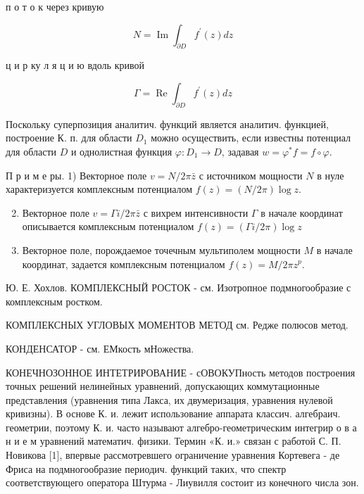 \documentclass[10pt]{article}
\begin{document}
п о т о к через кривую



\[

N=\operatorname{Im} \int_{\partial D} f^{\prime}(z) d z

\]



ц и р ку л я ц и ю вдоль кривой



\[

\Gamma=\operatorname{Re} \int_{\partial D} f^{\prime}(z) d z

\]



Поскольку суперпозиция аналитич. функций является аналитич. функцией, построение К. п. для области $D_{1}$ можно осуществить, если известны потенциал для области $D$ и однолистная функция $\varphi: D_{1} \rightarrow D$, задавая $w=\varphi^{*} f=f \circ \varphi$.



П р и м е ры. 1) Векторное поле $v=N / 2 \pi \bar{z}$ с источником мощности $N$ в нуле характеризуется комплексным потенциалом $f(z)=(N / 2 \pi) \log z$.



\begin{enumerate}

  \setcounter{enumi}{1}

  \item Векторное поле $v=\Gamma i / 2 \pi \bar{z}$ с вихрем интенсивности $\Gamma$ в начале координат описывается комплексным потенциалом $f(z)=(\Gamma i / 2 \pi) \log z$



  \item Векторное поле, порождаемое точечным мультиполем мощности $M$ в начале координат, задается комплексным потенциалом $f(z)=M / 2 \pi z^{p}$.



\end{enumerate}



Ю. Е. Хохлов. КОМПЛЕКСНЫЙ РОСТОК - см. Изотропное подмногообразие с комплексным ростком.



КОМПЛЕКСНЫХ УГЛОВЫХ МОМЕНТОВ МЕТОД см. Редже полюсов метод.



КОНДЕНСАТОР - см. ЕМкость мНожества.



КОНЕЧНОЗОННОЕ ИНТЕТРИРОВАНИЕ - сОВОКУПность методов построения точных решений нелинейных уравнений, допускающих коммутационные представления (уравнения типа Лакса, их двумеризация, уравнения нулевой кривизны). В основе К. и. лежит использование аппарата классич. алгебраич. геометрии, поэтому К. и. часто называют алгебро-геометрическим интегрир о в а н и е м уравнений математич. физики. Термин «К. и.» связан с работой С. П. Новикова [1], впервые рассмотревшего ограничение уравнения Кортевега - де Фриса на подмногообразие периодич. функций таких, что спектр соответствующего оператора Штурма - Лиувилля состоит из конечного числа зон.
\end{document}

